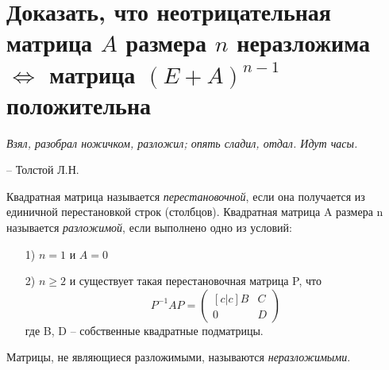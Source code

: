 \chapter{Доказать, что неотрицательная матрица $A$ размера $n$ неразложима $\Longleftrightarrow$ матрица $(E + A)^{n−1}$ положительна}
\label{cha:34}

\epigraph{
	\textit{Взял, разобрал ножичком, разложил; опять сладил, отдал. Идут часы.}}
{-- Толстой Л.Н.}

Квадратная матрица называется \textit{перестановочной}, если она получается из единичной перестановкой строк (столбцов). Квадратная матрица A размера n называется \textit{разложимой}, если выполнено одно из условий:
\begin{itemize}
	\item[1)] 
		$n = 1$ и $A = 0$
	\item[2)] 
		$n \ge 2$ и существует такая перестановочная матрица P, что
		$$P^{-1}AP = \begin{pmatrix}[c | c]
		B &  C \\ \hline
		0 &  D
	\end{pmatrix}$$
	где B, D – собственные квадратные подматрицы.
\end{itemize}
Матрицы, не являющиеся разложимыми, называются \textit{неразложимыми}.

